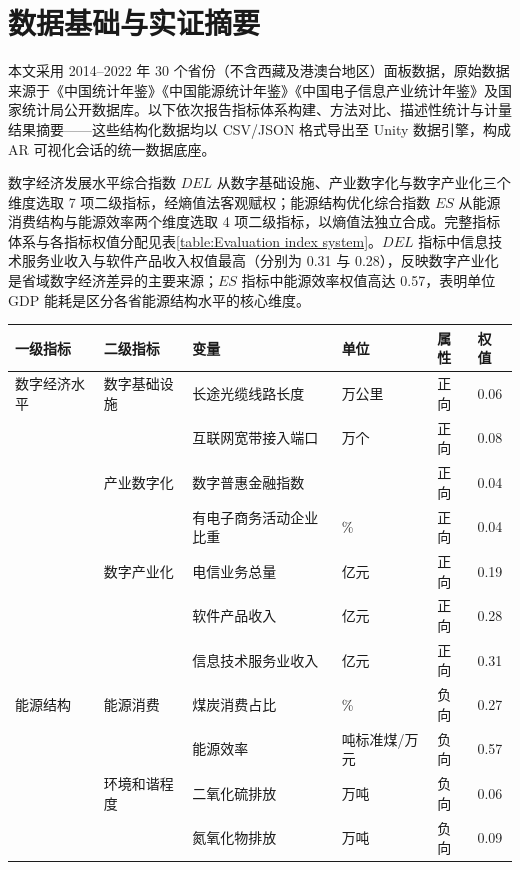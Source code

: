 \section{数据基础与实证摘要}
\label{sec:ch5_data}
本文采用 2014--2022 年 30 个省份（不含西藏及港澳台地区）面板数据，原始数据来源于《中国统计年鉴》《中国能源统计年鉴》《中国电子信息产业统计年鉴》及国家统计局公开数据库。以下依次报告指标体系构建、方法对比、描述性统计与计量结果摘要——这些结构化数据均以 CSV/JSON 格式导出至 Unity 数据引擎，构成 AR 可视化会话的统一数据底座。

数字经济发展水平综合指数 $DEL$ 从数字基础设施、产业数字化与数字产业化三个维度选取 7 项二级指标，经熵值法客观赋权；能源结构优化综合指数 $ES$ 从能源消费结构与能源效率两个维度选取 4 项二级指标，以熵值法独立合成。完整指标体系与各指标权值分配见表\ref{table:Evaluation index system}。$DEL$ 指标中信息技术服务业收入与软件产品收入权值最高（分别为 0.31 与 0.28），反映数字产业化是省域数字经济差异的主要来源；$ES$ 指标中能源效率权值高达 0.57，表明单位 GDP 能耗是区分各省能源结构水平的核心维度。
\begin{minipage}{\textwidth}
\centering
    \small
    \begin{tabular}{p{2.2cm}p{2.2cm}p{4.2cm}p{1.8cm}p{1.2cm}p{1.2cm}}
    \hline
        一级指标 & 二级指标 & 变量 & 单位 & 属性 & 权值  \\ \hline
        数字经济水平 & 数字基础设施 & 长途光缆线路长度 & 万公里 & 正向 & 0.06  \\
        ~ & ~ & 互联网宽带接入端口 & 万个 & 正向 & 0.08  \\
        ~ & 产业数字化 & 数字普惠金融指数 & ~ & 正向 & 0.04  \\
        ~ & ~ & 有电子商务活动企业比重 & \% & 正向 & 0.04  \\
        ~ & 数字产业化 & 电信业务总量 & 亿元 & 正向 & 0.19  \\
        ~ & ~ & 软件产品收入 & 亿元 & 正向 & 0.28  \\
        ~ & ~ & 信息技术服务业收入 & 亿元 & 正向 & 0.31  \\ \hline
        能源结构 & 能源消费 & 煤炭消费占比 & \% & 负向 & 0.27  \\
        ~ & ~ & 能源效率 & 吨标准煤/万元 & 负向 & 0.57  \\
        ~ & 环境和谐程度 & 二氧化硫排放 & 万吨 & 负向 & 0.06  \\
        ~ & ~ & 氮氧化物排放 & 万吨 & 负向 & 0.09  \\ \hline
    \end{tabular}
\end{minipage}

